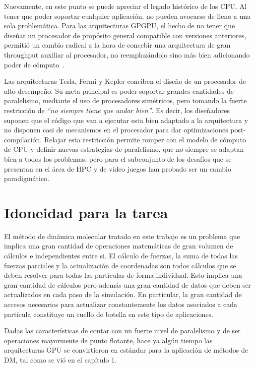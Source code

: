 Nuevamente, en este punto se puede apreciar el legado hist\'orico de los CPU.
Al tener que poder soportar cualquier aplicaci\'on, no pueden avocarse de lleno a una sola problem\'atica.
Para las arquitecturas GPGPU, el hecho de no tener que dise\~nar un procesador de prop\'osito general compatible con versiones anteriores, permiti\'o un cambio radical a la hora de concebir una arquitectura de gran throughput auxiliar al procesador, no reemplaz\'andolo sino m\'as bien adicionando poder de c\'omputo~\cite{GlaskowskyFermi}.

Las arquitecturas Tesla, Fermi y Kepler conciben el dise\~no de un procesador de alto desempe\~no.
Su meta principal es poder soportar grandes cantidades de paralelismo, mediante el uso de procesadores sim\'etricos, pero tomando la fuerte restricci\'on de \textsl{``no siempre tiene que andar bien''}.
Es decir, los dise\~nadores suponen que el c\'odigo que van a ejecutar esta bien adaptado a la arquitectura y no disponen casi de mecanismos en el procesador para dar optimizaciones post-compilaci\'on.
Relajar esta restricci\'on permite romper con el modelo de c\'omputo de CPU y definir nuevas estrategias de paralelismo, que no siempre se adaptan bien a todos los problemas, pero para el subconjunto de los desaf\'ios que se presentan en el \'area de HPC y de v\'ideo juegos han probado ser un cambio paradigm\'atico.

\section{Idoneidad para la tarea}

El método de dinámica molecular tratado en este trabajo es un problema que implica una gran cantidad de operaciones matemáticas de gran volumen de cálculos e independientes entre si.
El cálculo de fuerzas, la suma de todas las fuerzas parciales y la actualización de coordenadas son todos cálculos que se deben resolver para todas las partículas de forma individual. 
Esto implica una gran cantidad de cálculos pero además una gran cantidad de datos que deben ser actualizados en cada paso de la simulación.
En particular, la gran cantidad de accesos necesarios para actualizar constantemente los datos asociados a cada partícula constituye un cuello de botella en este tipo de aplicaciones.

Dadas las caracter\'isticas de contar con un fuerte nivel de paralelismo y de ser operaciones mayormente de punto flotante, hace ya algún tiempo 
las arquitecturas GPU se convirtieron en estándar para la aplicación de métodos de DM, tal como se vió en el capítulo 1.

